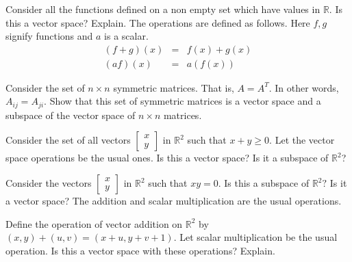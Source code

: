 \documentclass{ximera}
\begin{document}
\begin{problem}\label{prb:10.5} \label{functions}Consider all the functions defined on a non empty set
which have values in $\mathbb{R}$. Is this a vector space? Explain.
The operations are defined as follows. Here $f,g$ signify functions and $a$
is a scalar.
\begin{eqnarray*}
\left( f+g\right) \left( x\right) &=&f\left( x\right) +g\left( x\right) \\
\left( af\right) \left( x\right) &=&a\left( f\left( x\right) \right)
\end{eqnarray*}
\end{problem}




\begin{problem}\label{prb:10.10} Consider the set of $n\times n$ symmetric matrices. That is, $A=A^{T}.$
In other words, $A_{ij}=A_{ji}$. Show that this set of symmetric matrices is
a vector space and a subspace of the vector space of $n\times n$ matrices.
\end{problem}

\begin{problem}\label{prb:10.11} Consider the set of all vectors $\begin{bmatrix}x\\y\end{bmatrix}$ in $\mathbb{R}^{2}$
such that $x+y\geq 0.$ Let the vector space operations be the usual ones. Is
this a vector space? Is it a subspace of $\mathbb{R}^{2}$?
\end{problem}

\begin{problem}\label{prb:10.12} Consider the vectors $\begin{bmatrix}x\\y\end{bmatrix}$ in $\mathbb{R}^{2}$ such that $xy=0$. Is this a subspace of $\mathbb{R}^{2}?$ Is it a vector space? The
addition and scalar multiplication are the usual operations.
\end{problem}

\begin{problem}\label{prb:10.13} Define the operation of vector addition on $\mathbb{R}^{2}$ by $\left(
x,y\right) +\left( u,v\right) =\left( x+u,y+v+1\right) .$ Let scalar
multiplication be the usual operation. Is this a vector space with these
operations? Explain.
\end{problem}
\end{document}
